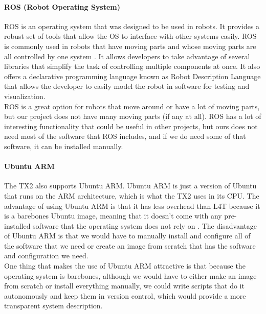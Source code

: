 \paragraph{ROS (Robot Operating System)}
ROS is an operating system that was designed to be used in robots. It provides a robust set of tools that allow the OS to interface with other systems easily. ROS is commonly used in robots that have moving parts and whose moving parts are all controlled by one system \cite{introROS}. It allows developers to take advantage of several libraries that simplify the task of controlling multiple components at once. It also offers a declarative programming language known as Robot Description Language that allows the developer to easily model the robot in software for testing and visualization.\\

ROS is a great option for robots that move around or have a lot of moving parts, but our project does not have many moving parts (if any at all). ROS has a lot of interesting functionality that could be useful in other projects, but ours does not need most of the software that ROS includes, and if we do need some of that software, it can be installed manually.

\paragraph{Ubuntu ARM}
The TX2 also supports Ubuntu ARM. Ubuntu ARM is just a version of Ubuntu that runs on the ARM architecture, which is what the TX2 uses in its CPU. The advantage of using Ubuntu ARM is that it has less overhead than L4T because it is a barebones Ubuntu image, meaning that it doesn't come with any pre-installed software that the operating system does not rely on \cite{ARM}. The disadvantage of Ubuntu ARM is that we would have to manually install and configure all of the software that we need or create an image from scratch that has the software and configuration we need.\\ 

One thing that makes the use of Ubuntu ARM attractive is that because the operating system is barebones, although we would have to either make an image from scratch or install everything manually, we could write scripts that do it autonomously and keep them in version control, which would provide a more transparent system description.

